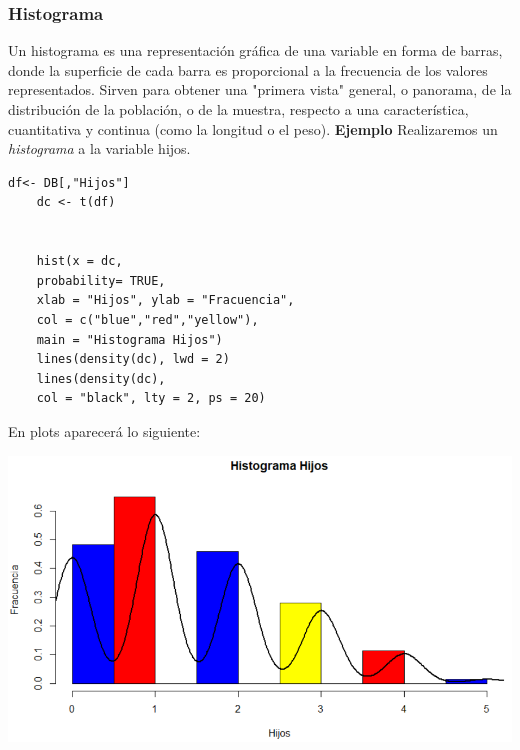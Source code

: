 \documentclass[12pt,hidelinks]{article}
\begin{document}
	\subsubsection{Histograma}
	Un histograma es una representación gráfica de una variable en forma de barras, donde la superficie de cada barra es proporcional a la frecuencia de los valores representados. Sirven para obtener una "primera vista" general, o panorama, de la distribución de la población, o de la muestra, respecto a una característica, cuantitativa y continua (como la longitud o el peso). \textbf{Ejemplo} Realizaremos un \textit{histograma} a la variable hijos.
	\begin{lstlisting}[frame=single]
	df<- DB[,"Hijos"]
	dc <- t(df)
	
	
	hist(x = dc,
	probability= TRUE,
	xlab = "Hijos", ylab = "Fracuencia",
	col = c("blue","red","yellow"),
	main = "Histograma Hijos")
	lines(density(dc), lwd = 2)
	lines(density(dc),
	col = "black", lty = 2, ps = 20)
	\end{lstlisting}
	En plots aparecerá lo siguiente:
	\begin{center}
		\includegraphics[width = 14cm]{images/2/GraficaHisto.PNG}
	\end{center}
\end{document}
